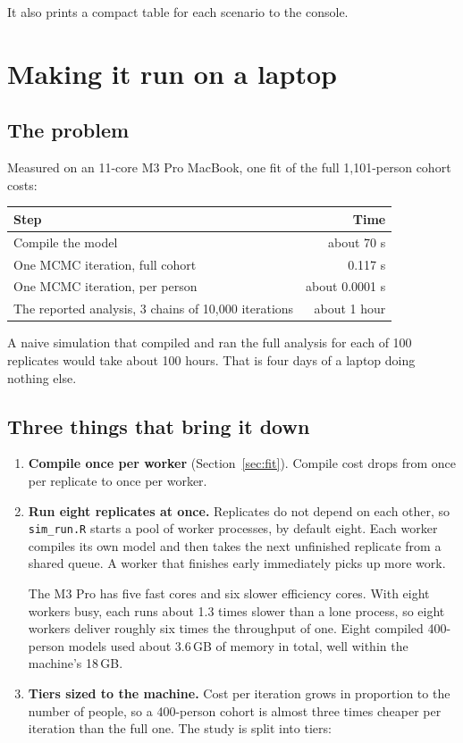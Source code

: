 \documentclass[11pt]{article}
\newcommand{\code}[1]{\texttt{\small #1}}
\begin{document}
It also prints a compact table for each scenario to the console.

\section{Making it run on a laptop}

\subsection{The problem}

Measured on an 11-core M3 Pro MacBook, one fit of the full 1,101-person cohort costs:

\begin{center}
\begin{tabular}{@{}l r@{}}
\toprule
Step & Time \\
\midrule
Compile the model & about 70 s \\
One MCMC iteration, full cohort & 0.117 s \\
One MCMC iteration, per person & about 0.0001 s \\
The reported analysis, 3 chains of 10,000 iterations & about 1 hour \\
\bottomrule
\end{tabular}
\end{center}

A naive simulation that compiled and ran the full analysis for each of 100 replicates would take about 100 hours. That is four days of a laptop doing nothing else.

\subsection{Three things that bring it down}

\begin{enumerate}
  \item \textbf{Compile once per worker} (Section~\ref{sec:fit}). Compile cost drops from once per replicate to once per worker.
  \item \textbf{Run eight replicates at once.} Replicates do not depend on each other, so \code{sim\_run.R} starts a pool of worker processes, by default eight. Each worker compiles its own model and then takes the next unfinished replicate from a shared queue. A worker that finishes early immediately picks up more work.

  The M3 Pro has five fast cores and six slower efficiency cores. With eight workers busy, each runs about 1.3 times slower than a lone process, so eight workers deliver roughly six times the throughput of one. Eight compiled 400-person models used about 3.6\,GB of memory in total, well within the machine's 18\,GB.
  \item \textbf{Tiers sized to the machine.} Cost per iteration grows in proportion to the number of people, so a 400-person cohort is almost three times cheaper per iteration than the full one. The study is split into tiers:
\end{enumerate}
\end{document}
